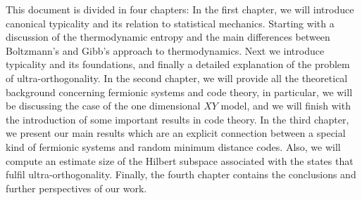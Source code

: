 
\indent This document is divided in four chapters: In the first chapter, we will introduce canonical typicality and its relation to statistical mechanics. Starting with a discussion of the thermodynamic entropy and the main differences between Boltzmann's  and Gibb's approach to thermodynamics. Next we introduce typicality and its foundations, and finally a detailed explanation of the problem of ultra-orthogonality. In the second chapter, we will provide all the theoretical background concerning fermionic systems and code theory, in particular, we will be discussing the case of the one dimensional $XY$ model, and we will finish with the introduction of some important results in code theory. In the third chapter, we present our main results which are an explicit connection between a special kind of fermionic systems and random minimum distance codes. Also, we will compute an estimate size of the Hilbert subspace associated with the states that fulfil ultra-orthogonality. Finally, the fourth chapter contains the conclusions and further perspectives of our work.



